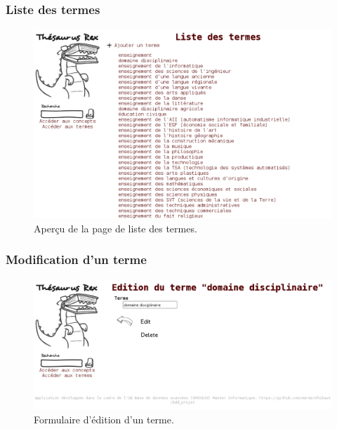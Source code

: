 \subsubsection{Liste des termes}
\begin{figure}[H]
\begin{center}
\includegraphics[width=\textwidth]{files/screen_termes}
\end{center}
\caption{Aperçu de la page de liste des termes.}
\end{figure}

\subsubsection{Modification d'un terme}
\begin{figure}[H]
\begin{center}
\includegraphics[width=\textwidth]{files/screen_terme_edit}
\end{center}
\caption{Formulaire d'édition d'un terme.}
\end{figure}

